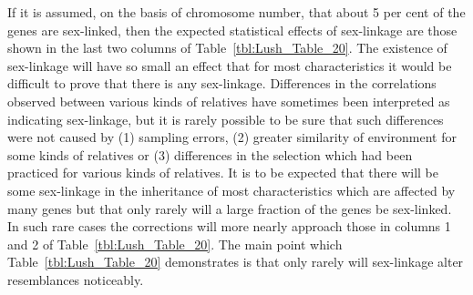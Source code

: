 If it is assumed, on the basis of chromosome number, that about 5
per cent of the genes are sex-linked, then the expected statistical
effects of sex-linkage are those shown in the last two columns of
Table~\ref{tbl:Lush_Table_20}. The existence of sex-linkage will have
so small an effect that for most characteristics it would be difficult
to prove that there is any sex-linkage. Differences in the correlations
observed between various kinds of relatives have sometimes been
interpreted as indicating sex-linkage, but it is rarely possible to be
sure that such differences were not caused by (1) sampling errors, (2)
greater similarity of environment for some kinds of relatives or (3)
differences in the selection which had been practiced for various kinds
of relatives. It is to be expected that there will be some sex-linkage
in the inheritance of most characteristics which are affected by many
genes but that only rarely will a large fraction of the genes be
sex-linked. In such rare cases the corrections will more nearly approach
those in columns 1 and 2 of Table~\ref{tbl:Lush_Table_20}. The main point
which Table~\ref{tbl:Lush_Table_20} demonstrates is that only rarely will
sex-linkage alter resemblances noticeably.


